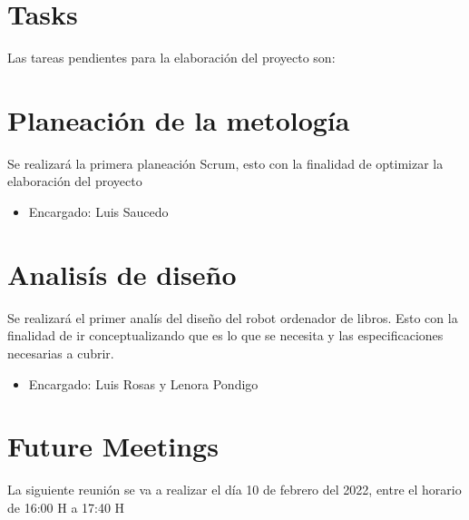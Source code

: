 \documentclass[12pt, a4paper]{article}
\begin{document}
\section*{Tasks}
Las tareas pendientes para la elaboración del proyecto son:
\setcounter{section}{0}

\section{Planeaci\'on de la metolog\'ia} %

Se realizar\'a la primera planeaci\'on Scrum, esto con la finalidad de optimizar la elaboraci\'on del proyecto

\begin{itemize}
    \item Encargado: Luis Saucedo
\end{itemize}

\section{Analis\'is de diseño} %

Se realizar\'a el primer anal\'is del diseño del robot ordenador de libros. Esto con la finalidad de ir conceptualizando que es lo que se necesita y las especificaciones necesarias a cubrir.

\begin{itemize}
    \item Encargado: Luis Rosas y Lenora Pondigo
\end{itemize}

\section*{Future Meetings} %
La siguiente reuni\'on se va a realizar el d\'ia 10 de febrero del 2022, entre el horario de 16:00 H a 17:40 H
\end{document}
